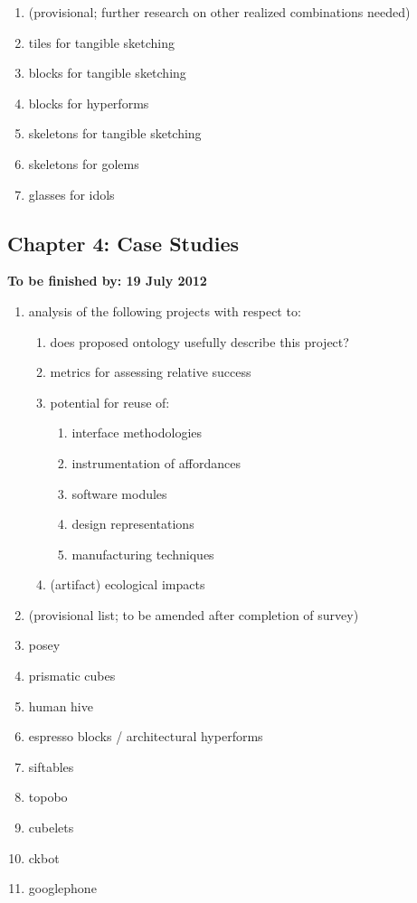 \documentclass[12pt,letterpaper,notitlepage,onecolumn]{article}
\begin{document}
\begin{enumerate}
    \item (provisional; further research on other realized combinations needed)
    \item tiles for tangible sketching
    \item blocks for tangible sketching
    \item blocks for hyperforms
    \item skeletons for tangible sketching
    \item skeletons for golems
    \item glasses for idols
\end{enumerate}


\subsection{Chapter 4: Case Studies}
%
\textbf{To be finished by: 19 July 2012}

\begin{enumerate}
    \item analysis of the following projects with respect to:
    \begin{enumerate}
        \item does proposed ontology usefully describe this project?
        \item metrics for assessing relative success
        \item potential for reuse of:
        \begin{enumerate}
            \item interface methodologies
            \item instrumentation of affordances
            \item software modules
            \item design representations
            \item manufacturing techniques
        \end{enumerate}
        \item (artifact) ecological impacts
    \end{enumerate}
    \item (provisional list; to be amended after completion of survey)
    \item posey
    \item prismatic cubes
    \item human hive
    \item espresso blocks / architectural hyperforms
    \item siftables
    \item topobo
    \item cubelets
    \item ckbot
    \item googlephone
\end{enumerate}
\end{document}

